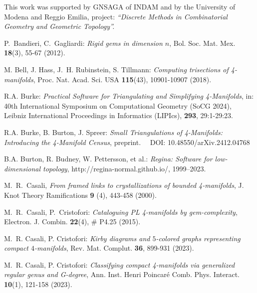 \documentclass[12pt,a4paper]{article}
\begin{document}
\bigskip

 This work was supported by GNSAGA of INDAM and by the University of Modena and Reggio Emilia, project:  {\it ``Discrete Methods in Combinatorial Geometry and Geometric Topology''.}

\bigskip 

\begin{thebibliography}{00}

{\footnotesize     
{} 
P.~Bandieri, C.~Gagliardi: {\it Rigid gems in dimension $n$}, Bol. Soc. Mat. Mex. \textbf{18}(3), 55-67 (2012).   

M. Bell, J. Hass, J.~H. Rubinstein, S. Tillmann: {\it Computing trisections of 4-manifolds}, Proc. Nat. Acad. Sci. USA {\bf 115}(43), 10901-10907  (2018).

 R.A. Burke: {\it Practical Software for Triangulating and Simplifying 4-Manifolds}, in: 40th International Symposium on Computational Geometry (SoCG 2024), Leibniz International Proceedings in Informatics (LIPIcs), {\bf 293}, 29:1-29:23.

 R.A. Burke, B. Burton, J. Spreer: {\it Small Triangulations of 4-Manifolds: Introducing the 4-Manifold Census}, preprint. \ \ DOI: 10.48550/arXiv.2412.04768 

 B.A. Burton, R. Budney, W. Pettersson, et al.: {\it Regina: Software for low-dimensional topology}, http://regina-normal.github.io/, 1999–2023.

M.~R.~Casali,  {\it From framed links to crystallizations of bounded 4-manifolds}, J. Knot Theory Ramifications {\bf 9} (4),  443-458  (2000).

M.~R.~Casali, P.~Cristofori: {\it Cataloguing PL 4-manifolds by gem-complexity}, Electron. J. Combin. {\bf 22}(4), \# P4.25  (2015).

M.~R. Casali, P. Cristofori: {\it Kirby diagrams and $5$-colored graphs representing compact $4$-manifolds}, Rev. Mat. Complut.  {\bf 36}, 899-931 (2023).   

M.~R. Casali, P. Cristofori: {\it Classifying compact 4-manifolds via generalized regular genus and G-degree},  Ann. Inst. Henri Poincar\'e Comb. Phys. Interact.  {\bf 10}(1), 121-158 (2023). 

}
\end{thebibliography}
\end{document}
